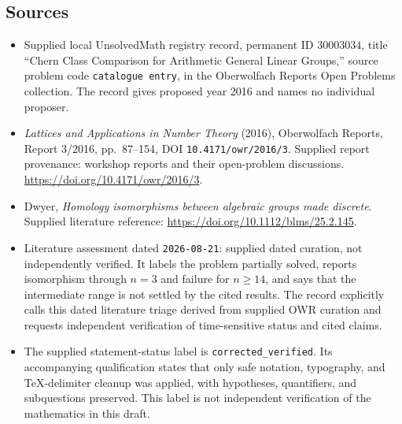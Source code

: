 \documentclass[11pt]{article}
\begin{document}
\subsection{Sources}
\begin{itemize}
\item Supplied local UnsolvedMath registry record, permanent ID \(30003034\), title ``Chern Class Comparison for Arithmetic General Linear Groups,'' source problem code \texttt{catalogue entry}, in the Oberwolfach Reports Open Problems collection. The record gives proposed year 2016 and names no individual proposer.
\item \emph{Lattices and Applications in Number Theory} (2016), Oberwolfach Reports, Report 3/2016, pp.\ 87--154, DOI \texttt{10.4171/owr/2016/3}. Supplied report provenance: workshop reports and their open-problem discussions. \url{https://doi.org/10.4171/owr/2016/3}.
\item Dwyer, \emph{Homology isomorphisms between algebraic groups made discrete}. Supplied literature reference: \url{https://doi.org/10.1112/blms/25.2.145}.
\item Literature assessment dated \texttt{2026-08-21}: supplied dated curation, not independently verified. It labels the problem partially solved, reports isomorphism through \(n=3\) and failure for \(n\geq14\), and says that the intermediate range is not settled by the cited results. The record explicitly calls this dated literature triage derived from supplied OWR curation and requests independent verification of time-sensitive status and cited claims.
\item The supplied statement-status label is \texttt{corrected\_verified}. Its accompanying qualification states that only safe notation, typography, and TeX-delimiter cleanup was applied, with hypotheses, quantifiers, and subquestions preserved. This label is not independent verification of the mathematics in this draft.
\end{itemize}
\end{document}
